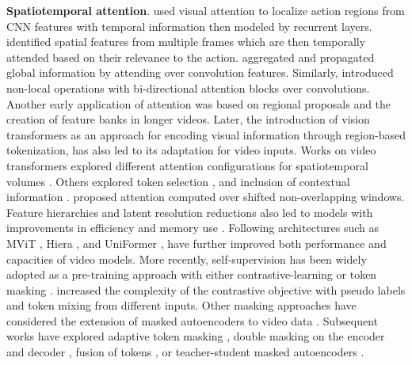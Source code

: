 \documentclass[smallextended,twocolumn,natbib]{svjour3}
\begin{document}
\noindent
\textbf{Spatiotemporal attention}. \citet{sharma2015action} used visual attention to localize action regions from CNN features with temporal information then modeled by recurrent layers. \citet{du2017recurrent} identified spatial features from multiple frames which are then temporally attended based on their relevance to the action. \citet{chen20182} aggregated and propagated global information by attending over convolution features. Similarly, \citet{wang2018non} introduced non-local operations with bi-directional attention blocks over convolutions. Another early application of attention \citep{girdhar2019video} was based on regional proposals and the creation of feature banks \citep{wu2019long} in longer videos. Later, the introduction of vision transformers \citep{dosovitskiy2020image} as an approach for encoding visual information through region-based tokenization, has also led to its adaptation for video inputs. Works on video transformers explored different attention configurations for spatiotemporal volumes \citep{arnab2021vivit,bertasius2021space}. Others explored token selection \citep{bulat2021space,ryoo2021tokenlearner,zha2021shifted}, and inclusion of contextual information \citep{kim2021relational}. \citet{liu2022video} proposed attention computed over shifted non-overlapping windows. Feature hierarchies and latent resolution reductions also led to models with improvements in efficiency \citep{fan2021multiscale,li2022mvitv2} and memory use \citep{wu2022memvit}. Following architectures such as MViT \citep{yan2022multiview}, Hiera \citep{ryali2023hiera}, and UniFormer \citep{li2022uniformer}, have further improved both performance and capacities of video models. More recently, self-supervision has been widely adopted as a pre-training approach with either contrastive-learning \citep{chen2020simple} or token masking \citep{he2022masked}. \citet{xing2023svformer} increased the complexity of the contrastive objective with pseudo labels and token mixing from different inputs. Other masking approaches have considered the extension of masked autoencoders to video data \citep{feichtenhofer2022masked,wei2022masked}. Subsequent works have explored adaptive token masking \citep{bandara2023adamae}, double masking on the encoder and decoder \citep{wang2023videomae}, fusion of tokens \citep{kim2024token}, or teacher-student masked autoencoders \citep{wang2023masked}.
\end{document}
